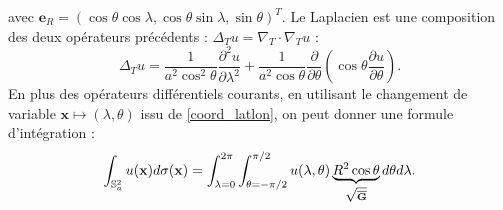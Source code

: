 avec $\mathbf{e}_{R} = \left( \cos \theta \cos \lambda, \cos \theta \sin \lambda, \sin \theta \right)^T$. Le Laplacien est une composition des deux opérateurs précédents : $\Delta_T u = \nabla_T \cdot \nabla_T u$ :
\begin{equation}\label{laplacien_lonlat}
\Delta_T u = \dfrac{1}{a^2 \cos^2 \theta} \dfrac{\partial^2 u }{\partial \lambda^2} + \dfrac{1}{a^2 \cos \theta} \dfrac{\partial}{\partial \theta} \left( \cos \theta \dfrac{\partial u}{\partial \theta} \right).
\end{equation}
En plus des opérateurs différentiels courants, en utilisant le changement de variable $\mathbf{x} \mapsto (\lambda, \theta)$ issu de \eqref{coord_latlon}, on peut donner une formule d'intégration :
\begin{equation}\label{integrale_lonlat}
\displaystyle\int_{\mathbb{S}_a^2} u(\mathbf{x})d\sigma(\mathbf{x})= \displaystyle\int_{\lambda=0}^{2 \pi} \displaystyle\int_{\theta = - \pi/2}^{\pi/2} u(\lambda, \theta) \underbrace{R^2 \cos \theta}_{\sqrt{\overline{\mathbf{G}}}} d \theta d \lambda.
\end{equation}

